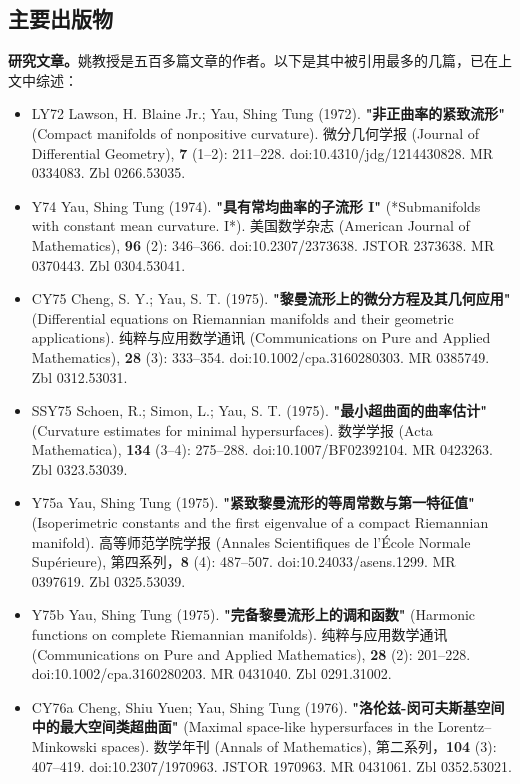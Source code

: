 \subsection{主要出版物}  
\textbf{研究文章。}姚教授是五百多篇文章的作者。以下是其中被引用最多的几篇，已在上文中综述：
\begin{itemize}
\item LY72 Lawson, H. Blaine Jr.; Yau, Shing Tung (1972). \textbf{"非正曲率的紧致流形"} (Compact manifolds of nonpositive curvature). 微分几何学报 (Journal of Differential Geometry), \textbf{7} (1–2): 211–228. doi:10.4310/jdg/1214430828. MR 0334083. Zbl 0266.53035.
\item Y74  Yau, Shing Tung (1974). \textbf{"具有常均曲率的子流形 I"} (*Submanifolds with constant mean curvature. I*). 美国数学杂志 (American Journal of Mathematics), \textbf{96} (2): 346–366. doi:10.2307/2373638. JSTOR 2373638. MR 0370443. Zbl 0304.53041.
\item CY75 Cheng, S. Y.; Yau, S. T. (1975). \textbf{"黎曼流形上的微分方程及其几何应用"} (Differential equations on Riemannian manifolds and their geometric applications). 纯粹与应用数学通讯 (Communications on Pure and Applied Mathematics), \textbf{28} (3): 333–354. doi:10.1002/cpa.3160280303. MR 0385749. Zbl 0312.53031.
\item SSY75 Schoen, R.; Simon, L.; Yau, S. T. (1975). \textbf{"最小超曲面的曲率估计"} (Curvature estimates for minimal hypersurfaces). 数学学报 (Acta Mathematica), \textbf{134} (3–4): 275–288. doi:10.1007/BF02392104. MR 0423263. Zbl 0323.53039.
\item Y75a  Yau, Shing Tung (1975). \textbf{"紧致黎曼流形的等周常数与第一特征值"} (Isoperimetric constants and the first eigenvalue of a compact Riemannian manifold). 高等师范学院学报 (Annales Scientifiques de l'École Normale Supérieure), 第四系列，\textbf{8} (4): 487–507. doi:10.24033/asens.1299. MR 0397619. Zbl 0325.53039.
\item Y75b Yau, Shing Tung (1975). \textbf{"完备黎曼流形上的调和函数"} (Harmonic functions on complete Riemannian manifolds). 纯粹与应用数学通讯 (Communications on Pure and Applied Mathematics), \textbf{28} (2): 201–228. doi:10.1002/cpa.3160280203. MR 0431040. Zbl 0291.31002.
\item CY76a  Cheng, Shiu Yuen; Yau, Shing Tung (1976). \textbf{"洛伦兹-闵可夫斯基空间中的最大空间类超曲面"} (Maximal space-like hypersurfaces in the Lorentz–Minkowski spaces). 数学年刊 (Annals of Mathematics), 第二系列，\textbf{104} (3): 407–419. doi:10.2307/1970963. JSTOR 1970963. MR 0431061. Zbl 0352.53021.

\end{itemize}
